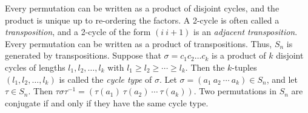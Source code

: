  Every permutation can be written as a product of disjoint cycles, and the product is unique up to re-ordering the factors.
 A 2-cycle is often called a \textit{transposition}, and a 2-cycle of the form $(i\ i+1)$ is an \textit{adjacent transposition}. 
 Every permutation can be written as a product of transpositions. Thus, $S_n$ is generated by transpositions.
 Suppose that $\sigma = c_1 c_2 \ldots c_k$ is a product of $k$ disjoint cycles of lengths $l_1, l_2, \ldots, l_k$ with $l_1 \ge l_2 \ge \cdots \ge l_k$. Then the $k$-tuples $(l_1, l_2, \ldots, l_k)$ is called the \emph{cycle type} of $\sigma$.
 Let $\sigma = (a_1\ a_2\ \cdots\ a_k) \in S_n$, and let $\tau \in S_n$. Then 
$\tau \sigma \tau^{-1} = (\tau(a_1)\ \tau(a_2)\ \cdots\ \tau(a_k)).$
 Two permutations in $S_n$ are conjugate if and only if they have the same cycle type.